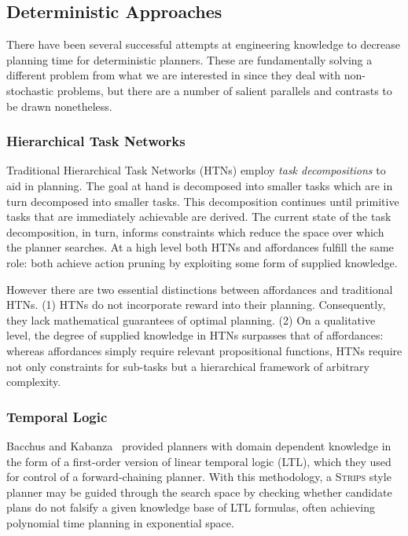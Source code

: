 \documentclass[letterpaper]{article}
\newcommand{\enote}[1]{\textcolor{Red}{\textbf{}}}
\begin{document}
\subsection{Deterministic Approaches}

There have been several successful attempts at engineering knowledge to
decrease planning time for deterministic planners. These are fundamentally solving
a different problem from what we are interested in since they deal with non-stochastic problems, but there are a number of salient parallels and contrasts to be drawn nonetheless.

\subsubsection{Hierarchical Task Networks}
Traditional Hierarchical Task Networks (HTNs) employ \textit{task decompositions} to aid in planning. The goal at hand is decomposed into smaller tasks which are in turn decomposed into smaller tasks. This decomposition continues until primitive tasks that are immediately achievable are derived. The current state of the task decomposition, in turn, informs constraints which reduce the space over which the planner searches. At a high level both HTNs and affordances fulfill the same role: both achieve action pruning by exploiting some form of supplied knowledge. 

However there are two essential distinctions between affordances and traditional HTNs.  (1) HTNs do not incorporate reward into their planning. Consequently, they lack mathematical guarantees of optimal planning. (2) On a qualitative level, the degree of supplied knowledge in HTNs surpasses that of affordances: whereas affordances simply require relevant propositional functions, HTNs require not only constraints for sub-tasks but a hierarchical framework of arbitrary complexity. \enote{Need citations for HTNs}

\subsubsection{Temporal Logic}
Bacchus and Kabanza~\cite{Bacchus95usingtemporal,Bacchus99usingtemporal} provided
planners with domain dependent knowledge in the form of a first-order version of linear
temporal logic (LTL), which they used for control of a forward-chaining planner. With this methodology, 
a \textsc{Strips} style planner may be guided through the search space by checking 
whether candidate plans do not falsify a given knowledge base of LTL formulas, often
achieving polynomial time planning in exponential space.
\end{document}
